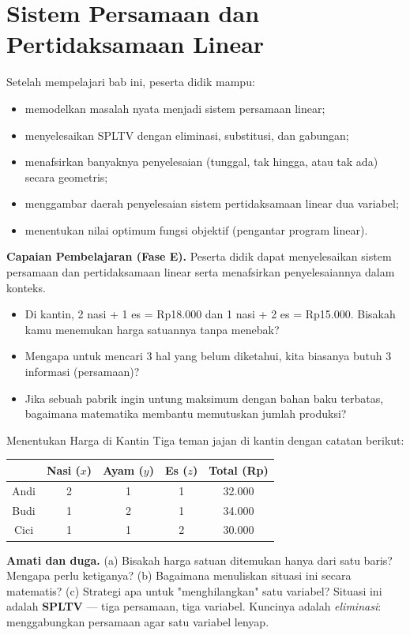 \documentclass[11pt,a4paper]{report}
\theoremstyle{gaya}
\begin{document}
\chapter{Sistem Persamaan dan Pertidaksamaan Linear}
\begin{tujuan}
Setelah mempelajari bab ini, peserta didik mampu:
\begin{itemize}[leftmargin=*,topsep=2pt]
  \item memodelkan masalah nyata menjadi sistem persamaan linear;
  \item menyelesaikan SPLTV dengan eliminasi, substitusi, dan gabungan;
  \item menafsirkan banyaknya penyelesaian (tunggal, tak hingga, atau tak ada) secara geometris;
  \item menggambar daerah penyelesaian sistem pertidaksamaan linear dua variabel;
  \item menentukan nilai optimum fungsi objektif (pengantar program linear).
\end{itemize}
\textbf{Capaian Pembelajaran (Fase E).} Peserta didik dapat menyelesaikan sistem persamaan dan pertidaksamaan linear serta menafsirkan penyelesaiannya dalam konteks.
\end{tujuan}

\begin{pemantik}
\begin{itemize}[leftmargin=*,topsep=2pt]
  \item Di kantin, 2 nasi + 1 es = Rp18.000 dan 1 nasi + 2 es = Rp15.000. Bisakah kamu menemukan harga satuannya tanpa menebak?
  \item Mengapa untuk mencari 3 hal yang belum diketahui, kita biasanya butuh 3 informasi (persamaan)?
  \item Jika sebuah pabrik ingin untung maksimum dengan bahan baku terbatas, bagaimana matematika membantu memutuskan jumlah produksi?
\end{itemize}
\end{pemantik}

\begin{studikasus}{Menentukan Harga di Kantin}
Tiga teman jajan di kantin dengan catatan berikut:
\begin{center}
\begin{tabular}{c|ccc|c}
\toprule
& Nasi ($x$) & Ayam ($y$) & Es ($z$) & Total (Rp) \\
\midrule
Andi & 2 & 1 & 1 & 32.000 \\
Budi & 1 & 2 & 1 & 34.000 \\
Cici & 1 & 1 & 2 & 30.000 \\
\bottomrule
\end{tabular}
\end{center}
\textbf{Amati dan duga.} (a) Bisakah harga satuan ditemukan hanya dari satu baris? Mengapa perlu ketiganya? (b) Bagaimana menuliskan situasi ini secara matematis? (c) Strategi apa untuk "menghilangkan" satu variabel? Situasi ini adalah \textbf{SPLTV} --- tiga persamaan, tiga variabel. Kuncinya adalah \emph{eliminasi}: menggabungkan persamaan agar satu variabel lenyap.
\end{studikasus}
\end{document}
